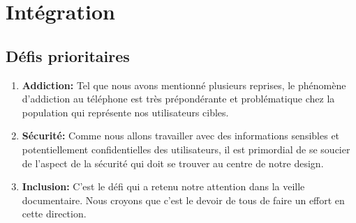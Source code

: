 \section{Intégration}
\subsection{Défis prioritaires}
\begin{enumerate}
	\item \textbf{Addiction:} Tel que nous avons mentionné plusieurs reprises, le phénomène d'addiction au téléphone est très prépondérante et problématique chez la population qui représente nos utilisateurs cibles.
	\item \textbf{Sécurité:} Comme nous allons travailler avec des informations sensibles et potentiellement confidentielles des utilisateurs, il est primordial de se soucier de l'aspect de la sécurité qui doit se trouver au centre de notre design.
	\item \textbf{Inclusion:} C'est le défi qui a retenu notre attention dans la veille documentaire. Nous croyons que c'est le devoir de tous de faire un effort en cette direction. 
\end{enumerate}

